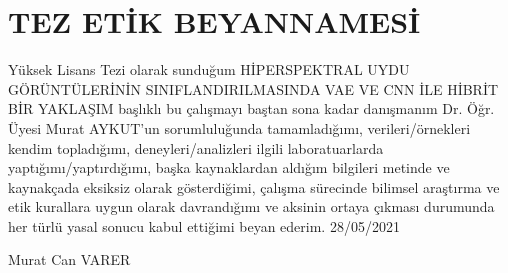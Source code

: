 \chapter*{TEZ ETİK BEYANNAMESİ}
\hspace{0.8cm} Yüksek Lisans Tezi olarak sunduğum HİPERSPEKTRAL UYDU GÖRÜNTÜLERİNİN SINIFLANDIRILMASINDA VAE VE CNN İLE HİBRİT BİR YAKLAŞIM başlıklı bu çalışmayı
baştan sona kadar danışmanım Dr. Öğr. Üyesi Murat AYKUT’un sorumluluğunda
tamamladığımı, verileri/örnekleri kendim topladığımı, deneyleri/analizleri ilgili
laboratuarlarda yaptığımı/yaptırdığımı, başka kaynaklardan aldığım bilgileri metinde ve
kaynakçada eksiksiz olarak gösterdiğimi, çalışma sürecinde bilimsel araştırma ve etik
kurallara uygun olarak davrandığımı ve aksinin ortaya çıkması durumunda her türlü yasal
sonucu kabul ettiğimi beyan ederim. 28/05/2021

\vspace{1.5cm}
\hfill Murat Can VARER

